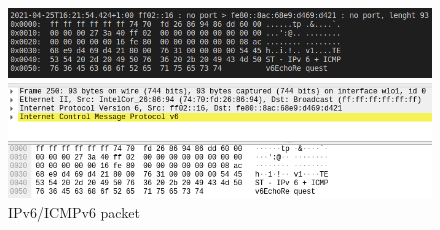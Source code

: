 \documentclass[a4paper,12pt]{article}
\begin{document}
\begin{figure}[H]
            \includegraphics[width=\linewidth]{cmp4ipk.png}
            
            \vspace{0.5cm}
            
            \includegraphics[width=\linewidth]{cmp4wireshark.png}
            
            \caption{IPv6/ICMPv6 packet}
\end{figure}


\nocite{ip6}
\nocite{filter}
\nocite{prg}
\nocite{sniff}
\nocite{arp}
\printbibliography
\end{document}
